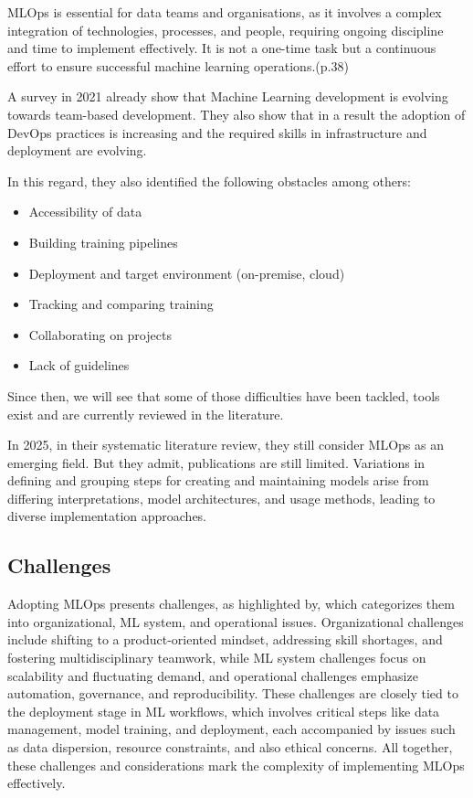 MLOps is essential for data teams and organisations, as it involves a complex integration of technologies, processes, and people, requiring ongoing discipline and time to implement effectively.
It is not a one-time task but a continuous effort to ensure successful machine learning operations.\cite{treveil2020introducing}(p.38)

A survey in 2021\cite{DBLP:journals/corr/abs-2103-08942} already show that Machine Learning development is evolving towards team-based development.
They also show that in a result the adoption of DevOps practices is increasing and the required skills in infrastructure and deployment are evolving.

In this regard, they also identified the following obstacles among others\cite{DBLP:journals/corr/abs-2103-08942}:
    \begin{itemize}
        \item Accessibility of data
        \item Building training pipelines
        \item Deployment and target environment (on-premise, cloud)
        \item Tracking and comparing training
        \item Collaborating on projects
        \item Lack of guidelines
    \end{itemize}

Since then, we will see that some of those difficulties have been tackled, tools exist and are currently reviewed in the literature.

In 2025, in their systematic literature review\cite{10855428}, they still consider MLOps as an emerging field.
But they admit, publications are still limited.
Variations in defining and grouping steps for creating and maintaining models arise from differing interpretations,
model architectures, and usage methods, leading to diverse implementation approaches.

\subsection{Challenges}\label{subsec:challenges}

Adopting MLOps presents challenges, as highlighted by\cite{Kreuzberger2022MachineLO}, which categorizes them into organizational,
ML system, and operational issues.
Organizational challenges include shifting to a product-oriented mindset, addressing skill shortages,
and fostering multidisciplinary teamwork, while ML system challenges focus on scalability and fluctuating demand,
and operational challenges emphasize automation, governance, and reproducibility.
These challenges are closely tied to the deployment stage in ML workflows, which involves critical steps like data management,
model training, and deployment, each accompanied by issues such as data dispersion, resource constraints, and also ethical concerns\cite{10.1145/3533378}.
All together, these challenges and considerations mark the complexity of implementing MLOps effectively.

